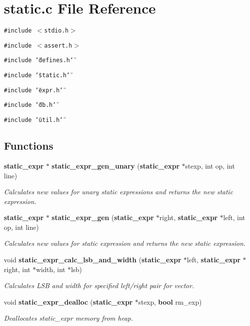 \section{static.c File Reference}
\label{static_8c}
{\tt \#include $<$stdio.h$>$}\par
{\tt \#include $<$assert.h$>$}\par
{\tt \#include \char`\"{}defines.h\char`\"{}}\par
{\tt \#include \char`\"{}static.h\char`\"{}}\par
{\tt \#include \char`\"{}expr.h\char`\"{}}\par
{\tt \#include \char`\"{}db.h\char`\"{}}\par
{\tt \#include \char`\"{}util.h\char`\"{}}\par
\subsection*{Functions}
\begin{CompactItemize}
\item 
{\bf static\_\-expr} $\ast$ {\bf static\_\-expr\_\-gen\_\-unary} ({\bf static\_\-expr} $\ast$stexp, int op, int line)
\begin{CompactList}\small\item\em Calculates new values for unary static expressions and returns the new static expression.\item\end{CompactList}\item 
{\bf static\_\-expr} $\ast$ {\bf static\_\-expr\_\-gen} ({\bf static\_\-expr} $\ast$right, {\bf static\_\-expr} $\ast$left, int op, int line)
\begin{CompactList}\small\item\em Calculates new values for static expression and returns the new static expression.\item\end{CompactList}\item 
void {\bf static\_\-expr\_\-calc\_\-lsb\_\-and\_\-width} ({\bf static\_\-expr} $\ast$left, {\bf static\_\-expr} $\ast$right, int $\ast$width, int $\ast$lsb)
\begin{CompactList}\small\item\em Calculates LSB and width for specified left/right pair for vector.\item\end{CompactList}\item 
void {\bf static\_\-expr\_\-dealloc} ({\bf static\_\-expr} $\ast$stexp, {\bf bool} rm\_\-exp)
\begin{CompactList}\small\item\em Deallocates static\_\-expr memory from heap.\item\end{CompactList}\end{CompactItemize}


